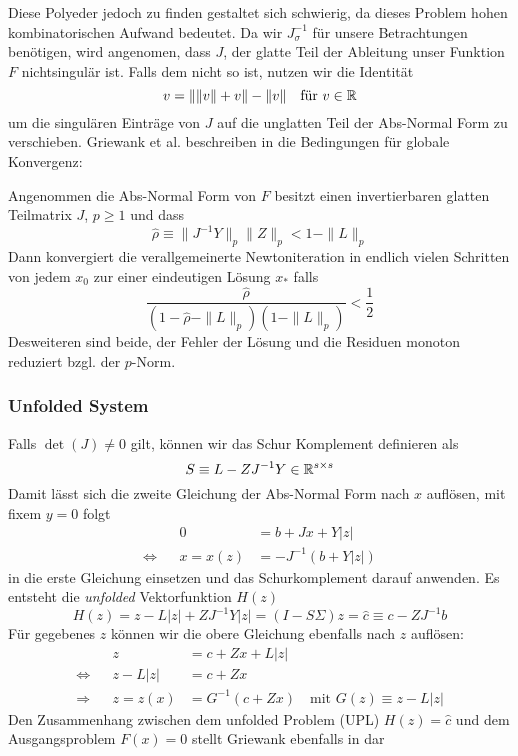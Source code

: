 Diese Polyeder jedoch zu finden gestaltet sich schwierig, da dieses Problem hohen kombinatorischen Aufwand bedeutet. 
Da wir $J_\sigma^{-1}$ für unsere Betrachtungen benötigen, wird angenomen, dass $J$, der glatte Teil der Ableitung unser Funktion $F$ nichtsingulär ist. Falls dem nicht so ist, nutzen wir die Identität
\[
 v = \|\|v\| + v\| - \|v\| \quad \text{für } v\in\mathbb{R}
\]
um die singulären Einträge von $J$ auf die unglatten Teil der Abs-Normal Form zu verschieben.
Griewank et al. beschreiben in \cite[Prop.5.2]{plan} die Bedingungen für globale Konvergenz:

\begin{theorem}
 Angenommen die Abs-Normal Form von $F$ besitzt einen invertierbaren glatten Teilmatrix $J$, $p\geq 1$ und dass
 \[
  \hat \rho \equiv \| J^{-1}Y \|_p \|Z\|_p < 1 - \|L\|_p
 \]
 Dann konvergiert die verallgemeinerte Newtoniteration in endlich vielen Schritten von jedem $x_0$ zur einer eindeutigen Lösung $x_*$ falls
 \[
  \frac{\hat \rho}{(1-\hat \rho - \|L\|_p)(1-\|L\|_p)} < \frac{1}{2}
 \]
Desweiteren sind beide, der Fehler der Lösung und die Residuen monoton reduziert bzgl. der $p$-Norm.
\end{theorem}

\subsubsection{Unfolded System}

Falls $\det(J) \neq 0$ gilt, können wir das Schur Komplement definieren als 
 \[
  S \equiv L -ZJ^{-1}Y \in \mathbb{R}^{s\times s}
 \]
Damit lässt sich die zweite Gleichung der Abs-Normal Form nach $x$ auflösen, mit fixem $y=0$ folgt
\[
 \begin{aligned}
		 && 0 &=  b+Jx + Y|z|   \\
 \Leftrightarrow && x = x(z) &=-J^{-1}(b+Y|z|)
 \end{aligned}
\]
in die erste Gleichung einsetzen und das Schurkomplement darauf anwenden. Es entsteht die \textit{unfolded} Vektorfunktion $H(z)$
\[
 H(z) = z - L|z| + ZJ^{-1}Y|z| = (I-S\Sigma)z = \hat c \equiv c-ZJ^{-1}b
 \]
Für gegebenes $z$ können wir die obere Gleichung ebenfalls nach $z$ auflösen:
\[
\begin{aligned}
		 && z &= c+Zx + L|z|\\
 \Leftrightarrow && z- L |z| &= c+Zx \\
 \Rightarrow && z = z(x) &= G^{-1}(c+Zx)\quad \text{mit }G(z)\equiv z-L|z|
\end{aligned} 
\]
Den Zusammenhang zwischen dem unfolded Problem (UPL) $H(z) = \hat c$ und dem Ausgangsproblem $F(x) = 0$ stellt Griewank ebenfalls in \cite[Lemma 6.5.]{plan} dar

